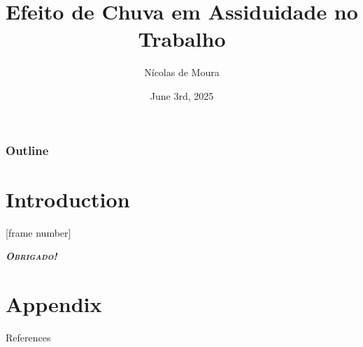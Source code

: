 \documentclass[compress,sans,12pt,aspectratio=169]{beamer}
\title{\textbf{Efeito de Chuva em Assiduidade no Trabalho}}
\date{June 3rd, 2025}
\author{Nícolas de Moura \inst{\textdagger}}
\institute{\inst{\textdagger} Escola de Economia de São Paulo - FGV/EESP}
\newcommand{\textdest}[1]{\textbf{\textit{\textsc{#1}}}}
\begin{document}
\frame[plain]{\titlepage}

    \begin{frame}[plain]
        \frametitle{Outline}
        \tableofcontents
    \end{frame}

    \section{Introduction}
    


\End

[frame number]


\begin{frame}
      \centering\LARGE{\textdest{Obrigado!}}
\end{frame}


\appendix
\section{Appendix}


\begin{frame}[allowframebreaks]{References}
    
\end{frame}
\end{document}
